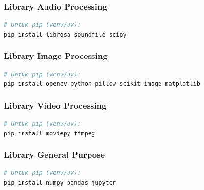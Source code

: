 \documentclass[11pt,a4paper]{article}
\begin{document}
\subsubsection{Library Audio Processing}
\begin{lstlisting}[language=bash, caption=Instalasi library audio]
# Untuk pip (venv/uv):
pip install librosa soundfile scipy
\end{lstlisting}

\subsubsection{Library Image Processing}
\begin{lstlisting}[language=bash, caption=Instalasi library image]
# Untuk pip (venv/uv):
pip install opencv-python pillow scikit-image matplotlib
\end{lstlisting}

\subsubsection{Library Video Processing}
\begin{lstlisting}[language=bash, caption=Instalasi library video]
# Untuk pip (venv/uv):
pip install moviepy ffmpeg
\end{lstlisting}

\subsubsection{Library General Purpose}
\begin{lstlisting}[language=bash, caption=Instalasi library umum]
# Untuk pip (venv/uv):
pip install numpy pandas jupyter
\end{lstlisting}
\end{document}
